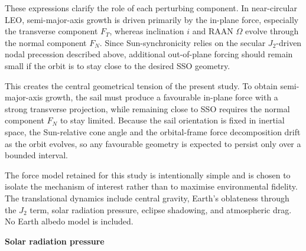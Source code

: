 \vspace{5pt}
\par\noindent These expressions clarify the role of each perturbing component. In near-circular LEO, semi-major-axis growth is driven primarily by the in-plane force, especially the transverse component \(F_T\), whereas inclination \(i\) and RAAN \(\Omega\) evolve through the normal component \(F_N\). Since Sun-synchronicity relies on the secular \(J_2\)-driven nodal precession described above, additional out-of-plane forcing should remain small if the orbit is to stay close to the desired SSO geometry.

\vspace{5pt}
\par\noindent This creates the central geometrical tension of the present study. To obtain semi-major-axis growth, the sail must produce a favourable in-plane force with a strong transverse projection, while remaining close to SSO requires the normal component \(F_N\) to stay limited. Because the sail orientation is fixed in inertial space, the Sun-relative cone angle and the orbital-frame force decomposition drift as the orbit evolves, so any favourable geometry is expected to persist only over a bounded interval.

\vspace{5pt}
\par\noindent The force model retained for this study is intentionally simple and is chosen to isolate the mechanism of interest rather than to maximise environmental fidelity. The translational dynamics include central gravity, Earth’s oblateness through the \(J_2\) term, solar radiation pressure, eclipse shadowing, and atmospheric drag. No Earth albedo model is included.

\vspace{7pt}
\noindent\textbf{Solar radiation pressure} \vspace{2pt}


